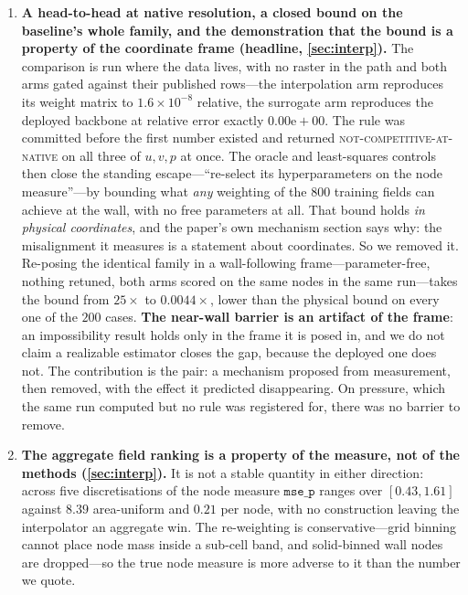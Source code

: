 \begin{enumerate}
\item \textbf{A head-to-head at native resolution, a closed bound on the baseline's whole
family, and the demonstration that the bound is a property of the coordinate frame
(headline, \autoref{sec:interp}).} The comparison is run where the data lives,
with no raster in the path and both arms gated against their published rows---the
interpolation arm reproduces its weight matrix to $1.6\times10^{-8}$ relative, the
surrogate arm reproduces the deployed backbone at relative error exactly $0.00\mathrm{e}
{+}00$. The rule was committed before the first number existed and returned
\textsc{not-competitive-at-native} on all three of $u,v,p$ at once. The oracle and
least-squares controls then close the standing escape---``re-select its
hyperparameters on the node measure''---by bounding what \emph{any} weighting of the $800$
training fields can achieve at the wall, with no free parameters at all. That bound holds
\emph{in physical coordinates}, and the paper's own mechanism section says why: the
misalignment it measures is a statement about coordinates. So we removed it. Re-posing the
identical family in a wall-following frame---parameter-free, nothing retuned, both arms
scored on the same nodes in the same run---takes the bound from $25\times$ to
$0.0044\times$, lower than the physical bound on every one of the $200$ cases.
\textbf{The near-wall barrier is an artifact of the frame}: an impossibility result holds
only in the frame it is posed in, and we do not claim a realizable estimator closes the
gap, because the deployed one does not. The contribution is the pair: a mechanism proposed
from measurement, then removed, with the effect it predicted disappearing. On pressure,
which the same run computed but no rule was registered for, there was no barrier to
remove.

\item \textbf{The aggregate field ranking is a property of the measure, not of the methods
(\autoref{sec:interp}).} It is not a stable quantity in either direction: across five
discretisations of the node measure $\texttt{mse\_p}$ ranges over $[0.43,1.61]$ against
$8.39$ area-uniform and $0.21$ per node, with no construction leaving the interpolator an
aggregate win. The re-weighting is conservative---grid binning cannot place node mass
inside a sub-cell band, and solid-binned wall nodes are dropped---so the true node measure
is more adverse to it than the number we quote.


\end{enumerate}
